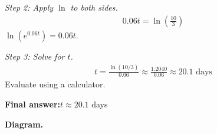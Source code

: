 \documentclass[11pt]{article}
\begin{document}
\textit{Step 2: Apply \( \ln \) to both sides.}
\[\begin{gathered}
0.06t = \ln\!\left(\frac{10}{3}\right)
\end{gathered}\]
\( \ln(e^{0.06t}) = 0.06t \).

\textit{Step 3: Solve for \( t \).}
\[\begin{gathered}
t = \frac{\ln(10/3)}{0.06} \approx \frac{1.2040}{0.06} \approx 20.1 \text{ days}
\end{gathered}\]
Evaluate using a calculator.

\begin{answerbox}
\textbf{Final answer:}\quad \(\displaystyle  t \approx 20.1 \) days
\end{answerbox}
\textbf{Diagram.}

\begin{center}
\end{center}
\end{document}
